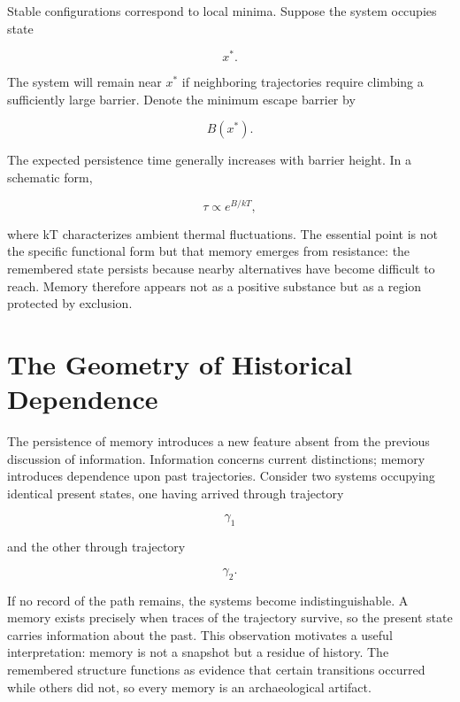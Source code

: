 \documentclass[11pt,oneside]{book}
\theoremstyle{plain}
\theoremstyle{definition}
\theoremstyle{remark}
\begin{document}
Stable configurations correspond to local minima. Suppose the system occupies state

\begin{equation}
x^\ast.
\end{equation}

The system will remain near \(x^\ast\) if neighboring trajectories require climbing a sufficiently large barrier. Denote the minimum escape barrier by

\begin{equation}
B(x^\ast).
\end{equation}

The expected persistence time generally increases with barrier height. In a schematic form,

\begin{equation}
\tau
\propto
e^{B/kT},
\end{equation}

where kT characterizes ambient thermal fluctuations. The essential point is not the specific functional form but that memory emerges from resistance: the remembered state persists because nearby alternatives have become difficult to reach. Memory therefore appears not as a positive substance but as a region protected by exclusion.

\section{The Geometry of Historical Dependence}

The persistence of memory introduces a new feature absent from the previous discussion of information. Information concerns current distinctions; memory introduces dependence upon past trajectories. Consider two systems occupying identical present states, one having arrived through trajectory

\begin{equation}
\gamma_1
\end{equation}

and the other through trajectory

\begin{equation}
\gamma_2.
\end{equation}

If no record of the path remains, the systems become indistinguishable. A memory exists precisely when traces of the trajectory survive, so the present state carries information about the past. This observation motivates a useful interpretation: memory is not a snapshot but a residue of history. The remembered structure functions as evidence that certain transitions occurred while others did not, so every memory is an archaeological artifact.
\end{document}
